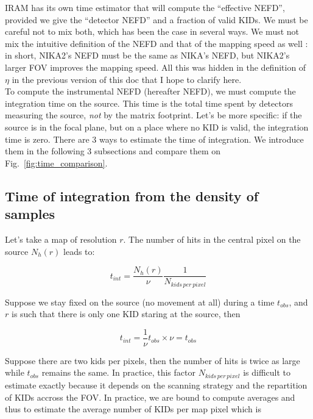 IRAM has its own time estimator that will compute the ``effective NEFD'',
provided we give the ``detector NEFD'' and a fraction of valid KIDs. We must be
careful not to mix both, which has been the case in several ways. We must not
mix the intuitive definition of the NEFD and that of the mapping speed as well :
in short, NIKA2's NEFD must be the same as NIKA's NEFD, but NIKA2's larger FOV
improves the mapping speed. All this was hidden in the definition of $\eta$ in
the previous version of this doc that I hope to clarify here.\\

To compute the instrumental NEFD (hereafter NEFD), we must compute the
integration time on the source. This time is the total time spent by detectors
measuring the source, \emph{not} by the matrix footprint. Let's be more
specific: if the source is in the focal plane, but on a place where no KID is
valid, the integration time is zero. There are 3 ways to estimate the time of
integration. We introduce them in the following 3 subsections and compare them
on Fig.~\ref{fig:time_comparison}.

\subsection{Time of integration from the density of samples}

Let's take a map of resolution $r$. The number of hits in the central pixel on
the source $N_h(r)$ leads to:

\begin{equation}
t_{int} = \frac{N_h(r)}{\nu}\frac{1}{N_{kids\,per\,pixel}}
\end{equation}

Suppose we stay fixed on the source (no movement at all) during a time $t_{obs}$, and $r$ is such that
there is only one KID staring at the source, then

\begin{equation}
t_{int} = \frac{1}{\nu}t_{obs}\times\nu = t_{obs}
\end{equation}

Suppose there are two kids per pixels, then the number of hits is twice as large
while $t_{obs}$ remains the same. In practice, this factor
$N_{kids\,per\,pixel}$ is difficult to estimate exactly because it depends on the
scanning strategy and the repartition of KIDs accross the FOV. In practice, we
are bound to compute averages and thus to estimate the average number of KIDs
per map pixel which is 

